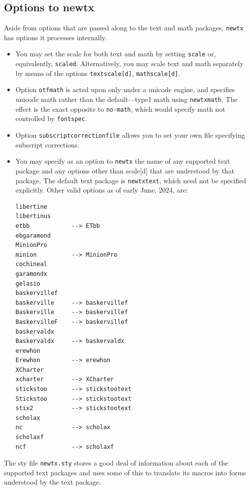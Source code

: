 \documentclass[\fsc]{article}
\theoremstyle{oldplain}
\theoremstyle{plain}
\begin{document}
\subsection{Options to newtx}
Aside from options that are passed along to the text and math packages, {\tt newtx} has options it processes internally.
\begin{itemize}
\item
You may set the scale for both text and math by setting {\tt scale} or, equivalently, {\tt scaled}. Alternatively, you may scale text and math separately by means of the options {\tt textscale[d]}, {\tt mathscale[d]}.
\item Option {\tt otfmath} is acted upon only under a unicode engine, and specifies unicode math rather than the default---type1 math using {\tt newtxmath}. The effect is the exact opposite to {\tt no-math}, which would specify math not controlled by {\tt fontspec}.
\item Option {\tt subscriptcorrectionfile} allows you to set your own file specifying subscript corrections.
\item You may specify as an option to {\tt newtx} the name of any supported text package and any options other than scale[d] that are understood by that package. The default text package is {\tt newtxtext}, which need not be specified explicitly. Other valid options as of early June, 2024, are:
\begin{verbatim}
libertine
libertinus
etbb			--> ETbb
ebgaramond
MinionPro
minion  		--> MinionPro
cochineal
garamondx
gelasio
baskervillef
baskerville		--> baskervillef
Baskerville		--> baskervillef
BaskervilleF	--> baskervillef
baskervaldx
Baskervaldx		--> baskervaldx
erewhon
Erewhon			--> erewhon
XCharter
xcharter		--> XCharter
stickstoo		--> stickstootext
Stickstoo		--> stickstootext
stix2			--> stickstootext
scholax	
nc 				--> scholax
scholaxf
ncf				--> scholaxf
\end{verbatim}
\end{itemize}
The sty file {\tt newtx.sty} stores a good deal of information about each of the supported text packages and uses some of this to translate its macros into forms understood by the text package.
\end{document}
